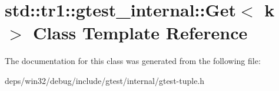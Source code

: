 \hypertarget{classstd_1_1tr1_1_1gtest__internal_1_1_get}{}\section{std\+:\+:tr1\+:\+:gtest\+\_\+internal\+:\+:Get$<$ k $>$ Class Template Reference}
\label{classstd_1_1tr1_1_1gtest__internal_1_1_get}


The documentation for this class was generated from the following file\+:\begin{DoxyCompactItemize}
\item 
deps/win32/debug/include/gtest/internal/gtest-\/tuple.\+h\end{DoxyCompactItemize}
